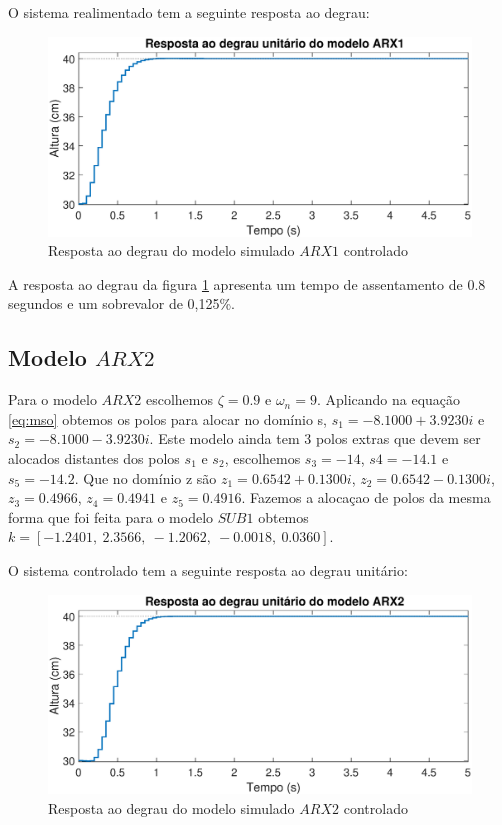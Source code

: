 O sistema realimentado tem a seguinte resposta ao degrau:

\begin{figure}[H]
	\centering
	\includegraphics[width=1\linewidth]{respostadegrauarx1c}
	\caption[Resposta ao degrau do modelo simulado $ARX1$ controlado]{Resposta ao degrau do modelo simulado $ARX1$ controlado}
	\label{fig:respostadegrauarx1c}
\end{figure}


A resposta ao degrau da figura \ref{fig:respostadegrauarx1c} apresenta um tempo de assentamento de 0.8 segundos e um sobrevalor de 0,125\%.

\subsection{Modelo $ARX2$}\label{s:ctrlarx2}
Para o modelo $ARX2$ escolhemos $\zeta=0.9$ e $\omega_n=9$. Aplicando na equação \eqref{eq:mso} obtemos os polos para alocar no domínio s, $s_1=-8.1000 + 3.9230i$ e $s_2=-8.1000 - 3.9230i$. Este modelo ainda tem 3 polos extras que devem ser alocados distantes dos polos $s_1$ e $s_2$, escolhemos $s_3=-14$, $s4=-14.1$ e $s_5=-14.2$. Que no domínio z são $z_1=0.6542 + 0.1300i$, $z_2=0.6542 - 0.1300i$, $z_3=0.4966$, $z_4=0.4941$ e $z_5=0.4916$. Fazemos a alocaçao de polos da mesma forma que foi feita para o modelo $SUB1$ obtemos $k=[-1.2401,~2.3566,~-1.2062,~-0.0018,~0.0360]$.

O sistema controlado tem a seguinte resposta ao degrau unitário:

\begin{figure}[H]
	\centering
	\includegraphics[width=1\linewidth]{respostadegrauarx2c}
	\caption[Resposta ao degrau do modelo $ARX2$]{Resposta ao degrau do modelo simulado $ARX2$ controlado}
	\label{fig:respostadegrauarx2c}
\end{figure}

